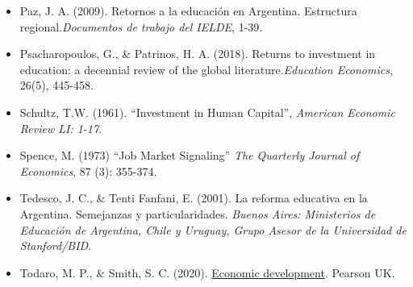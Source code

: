 \documentclass[a4paper]{article}
\theoremstyle{plain}
\theoremstyle{definition}
\begin{document}
\begin{itemize}
    \item Paz, J. A. (2009). Retornos a la educación en Argentina. Estructura regional.\textit{Documentos de trabajo del IELDE}, 1-39.

    \item Psacharopoulos, G., \& Patrinos, H. A. (2018). Returns to investment in education: a decennial review of the global literature.\textit{Education Economics}, 26(5), 445-458.

    \item Schultz, T.W. (1961). “Investment in Human Capital”, \textit{American Economic Review LI: 1-17}.

    \item Spence, M. (1973) “Job Market Signaling” \textit{The Quarterly Journal of Economics}, 87 (3): 355-374.
    
    \item Tedesco, J. C., \& Tenti Fanfani, E. (2001). La reforma educativa en la Argentina. Semejanzas y particularidades. \textit{Buenos Aires: Ministerios de Educación de Argentina, Chile y Uruguay, Grupo Asesor de la Universidad de Stanford/BID}.

    \item Todaro, M. P., \& Smith, S. C. (2020). \underline{Economic development}. Pearson UK.

\end{itemize}
\end{document}
